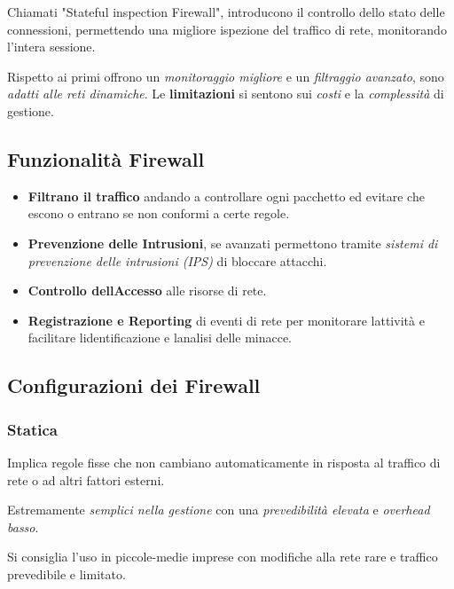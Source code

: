 Chiamati "Stateful inspection Firewall", introducono il controllo dello
stato delle connessioni, permettendo una migliore ispezione del traffico
di rete, monitorando l'intera sessione.

Rispetto ai primi offrono un \emph{monitoraggio migliore} e un
\emph{filtraggio avanzato}, sono \emph{adatti alle reti dinamiche}. Le
\textbf{limitazioni} si sentono sui \emph{costi} e la \emph{complessità}
di gestione.

\subsection{Funzionalità Firewall}\label{funzionalituxe0-firewall}

\begin{itemize}
\item
  \textbf{Filtrano il traffico} andando a controllare ogni pacchetto ed
  evitare che escono o entrano se non conformi a certe regole.
\item
  \textbf{Prevenzione delle Intrusioni}, se avanzati permettono tramite
  \emph{sistemi di prevenzione delle intrusioni (IPS)} di bloccare
  attacchi.
\item
  \textbf{Controllo dell\textquotesingle Accesso} alle risorse di rete.
\item
  \textbf{Registrazione e Reporting} di eventi di rete per monitorare
  l\textquotesingle attività e facilitare
  l\textquotesingle identificazione e l\textquotesingle analisi delle
  minacce.
\end{itemize}

\subsection{Configurazioni dei
Firewall}\label{configurazioni-dei-firewall}

\subsubsection{Statica}\label{statica}

Implica regole fisse che non cambiano automaticamente in risposta al
traffico di rete o ad altri fattori esterni.

Estremamente \emph{semplici nella gestione} con una \emph{prevedibilità
elevata} e \emph{overhead basso}.

Si consiglia l'uso in piccole-medie imprese con modifiche alla rete rare
e traffico prevedibile e limitato.

